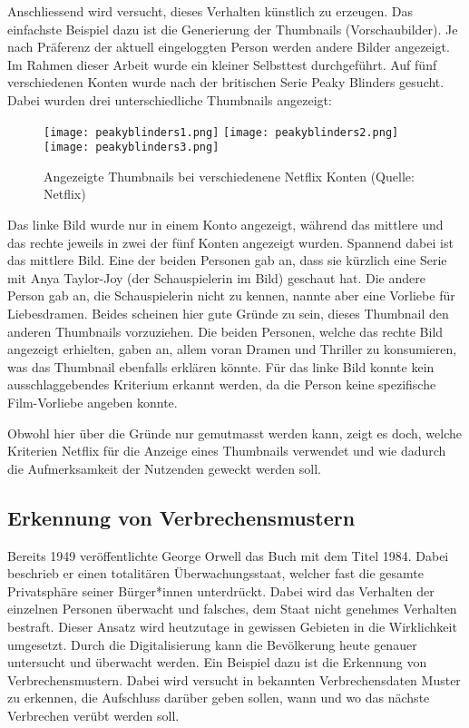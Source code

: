 Anschliessend wird versucht, dieses Verhalten künstlich zu erzeugen. Das einfachste Beispiel dazu ist die Generierung der Thumbnails (Vorschaubilder). Je nach Präferenz der aktuell eingeloggten Person werden andere Bilder angezeigt. Im Rahmen dieser Arbeit wurde ein kleiner Selbsttest durchgeführt. Auf fünf verschiedenen Konten wurde nach der britischen Serie Peaky Blinders gesucht. Dabei wurden drei unterschiedliche Thumbnails angezeigt:
\begin{figure*}[ht!]
	\texttt{[image: peakyblinders1.png]}\hfill
	\texttt{[image: peakyblinders2.png]}\hfill
	\texttt{[image: peakyblinders3.png]}
	\caption{Angezeigte Thumbnails bei verschiedenene Netflix Konten (Quelle: Netflix)}
\end{figure*}

Das linke Bild wurde nur in einem Konto angezeigt, während das mittlere und das rechte jeweils in zwei der fünf Konten angezeigt wurden.
Spannend dabei ist das mittlere Bild. Eine der beiden Personen gab an, dass sie kürzlich eine Serie mit Anya Taylor-Joy (der Schauspielerin im Bild) geschaut hat. Die andere Person gab an, die Schauspielerin nicht zu kennen, nannte aber eine Vorliebe für Liebesdramen. Beides scheinen hier gute Gründe zu sein, dieses Thumbnail den anderen Thumbnails vorzuziehen. Die beiden Personen, welche das rechte Bild angezeigt erhielten, gaben an, allem voran Dramen und Thriller zu konsumieren, was das Thumbnail ebenfalls erklären könnte. Für das linke Bild konnte kein ausschlaggebendes Kriterium erkannt werden, da die Person keine spezifische Film-Vorliebe angeben konnte.

Obwohl hier über die Gründe nur gemutmasst werden kann, zeigt es doch, welche Kriterien Netflix für die Anzeige eines Thumbnails verwendet und wie dadurch die Aufmerksamkeit der Nutzenden geweckt werden soll.

\subsection{Erkennung von Verbrechensmustern}
Bereits 1949 veröffentlichte George Orwell das Buch mit dem Titel 1984. Dabei beschrieb er einen totalitären Überwachungsstaat, welcher fast die gesamte Privatsphäre seiner Bürger*innen unterdrückt. Dabei wird das Verhalten der einzelnen Personen überwacht und falsches, dem Staat nicht genehmes Verhalten bestraft. 
Dieser Ansatz wird heutzutage in gewissen Gebieten in die Wirklichkeit umgesetzt. Durch die Digitalisierung kann die Bevölkerung heute genauer untersucht und überwacht werden.
Ein Beispiel dazu ist die Erkennung von Verbrechensmustern. Dabei wird versucht in bekannten Verbrechensdaten Muster zu erkennen, die Aufschluss darüber geben sollen, wann und wo das nächste Verbrechen verübt werden soll.

